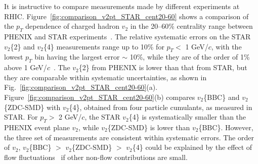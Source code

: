 \documentclass[aps,prc,superscriptaddress,showpacs,floatfix,twocolumn]{revtex4}
\newcommand \gevc{GeV/$c$\xspace}
\newcommand \pt{\mbox{$p_T$}\xspace}
\begin{document}
It is instructive to compare measurements made by different experiments at 
RHIC. Figure~\ref{fig:comparison_v2pt_STAR_cent20-60} shows a comparison 
of the \pt dependence of charged hadron $v_2$ in the 20--60\% centrality 
range between PHENIX and STAR experiments~\cite{Adams:2004wz}. The 
relative systematic errors on the STAR $v_2$\{2\} and $v_2$\{4\} 
measurements range up to 10\% for \pt $<$ 1 \gevc, with the lowest \pt bin 
having the largest error $\sim$ 10\%, while they are of the order of 1\% 
above 1 \gevc~\cite{Adams:2004wz}. The $v_2$\{2\} from PHENIX is lower 
than that from STAR, but they are comparable within systematic 
uncertainties, as shown in 
Fig.~\ref{fig:comparison_v2pt_STAR_cent20-60}(a). 
Figure~\ref{fig:comparison_v2pt_STAR_cent20-60}(b) compares $v_2$\{BBC\} 
and $v_2$\{ZDC-SMD\} with $v_2$\{4\}, obtained from four particle 
cumulants, as measured in STAR. For \pt $>$ 2 \gevc, the STAR $v_2$\{4\} 
is systematically smaller than the PHENIX event plane $v_2$, while 
$v_2$\{ZDC-SMD\} is lower than $v_2$\{BBC\}. However, the three set of 
measurements are consistent within systematic errors. The order of $v_2$, 
$v_2$\{BBC\} $>$ $v_2$\{ZDC-SMD\} $>$ $v_2$\{4\} could be explained by the 
effect of flow fluctuations~\cite{Bhalerao:2006tp,Miller:2003kd} if other 
non-flow contributions are small.
\end{document}
